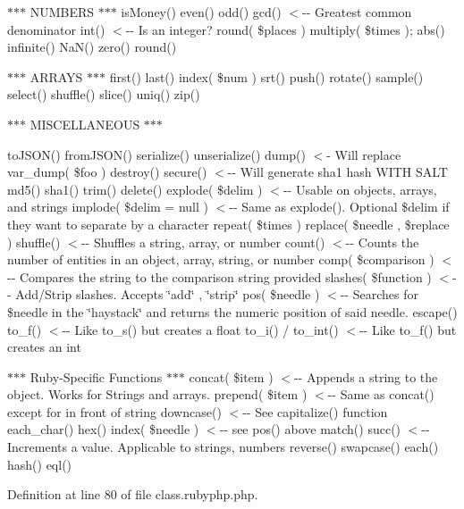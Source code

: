 $\ast$$\ast$$\ast$ N\-U\-M\-B\-E\-R\-S $\ast$$\ast$$\ast$ is\-Money() even() odd() gcd() $<$-\/-\/ Greatest common denominator int() $<$-\/-\/ Is an integer? round( \$places ) multiply( \$times ); abs() infinite() Na\-N() zero() round()

$\ast$$\ast$$\ast$ A\-R\-R\-A\-Y\-S $\ast$$\ast$$\ast$ first() last() index( \$num ) srt() push() rotate() sample() select() shuffle() slice() uniq() zip()

$\ast$$\ast$$\ast$ M\-I\-S\-C\-E\-L\-L\-A\-N\-E\-O\-U\-S $\ast$$\ast$$\ast$

to\-J\-S\-O\-N() from\-J\-S\-O\-N() serialize() unserialize() dump() $<$-\/ Will replace var\-\_\-dump( \$foo ) destroy() secure() $<$-\/-\/ Will generate sha1 hash W\-I\-T\-H S\-A\-L\-T md5() sha1() trim() delete() explode( \$delim ) $<$-\/-\/ Usable on objects, arrays, and strings implode( \$delim = null ) $<$-\/-\/ Same as explode(). Optional \$delim if they want to separate by a character repeat( \$times ) replace( \$needle , \$replace ) shuffle() $<$-\/-\/ Shuffles a string, array, or number count() $<$-\/-\/ Counts the number of entities in an object, array, string, or number comp( \$comparison ) $<$-\/-\/ Compares the string to the comparison string provided slashes( \$function ) $<$-\/-\/ Add/\-Strip slashes. Accepts \char`\"{}add\char`\"{} , \char`\"{}strip\char`\"{} pos( \$needle ) $<$-\/-\/ Searches for \$needle in the \char`\"{}haystack\char`\"{} and returns the numeric position of said needle. escape() to\-\_\-f() $<$-\/-\/ Like to\-\_\-s() but creates a float to\-\_\-i() / to\-\_\-int() $<$-\/-\/ Like to\-\_\-f() but creates an int

$\ast$$\ast$$\ast$ Ruby-\/\-Specific Functions $\ast$$\ast$$\ast$ concat( \$item ) $<$-\/-\/ Appends a string to the object. Works for Strings and arrays. prepend( \$item ) $<$-\/-\/ Same as concat() except for in front of string downcase() $<$-\/-\/ See capitalize() function each\-\_\-char() hex() index( \$needle ) $<$-\/-\/ see pos() above match() succ() $<$-\/-\/ Increments a value. Applicable to strings, numbers reverse() swapcase() each() hash() eql() 

Definition at line 80 of file class.\-rubyphp.\-php.

